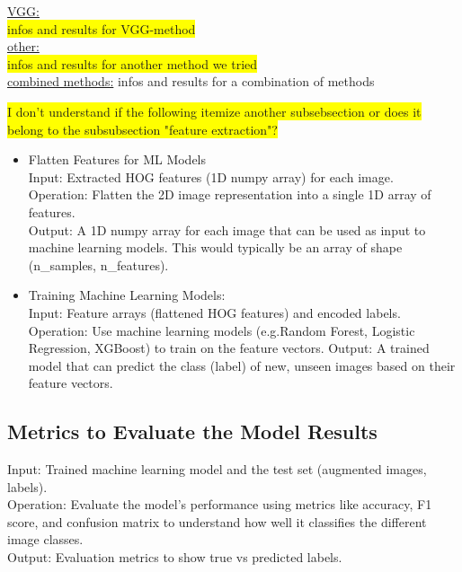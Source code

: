\documentclass{article}
\begin{document}
\vspace{0.5cm}
    

\underline{VGG:}\\
\colorbox{yellow}{infos and results for VGG-method}
\\

\underline{other:}\\
\colorbox{yellow}{infos and results for another method we tried}
\\

\underline{combined methods:}
infos and results for a combination of methods

\colorbox{yellow}{I don't understand if the following itemize another subsebsection or does it belong to the subsubsection "feature extraction"?}
\begin{itemize}
    \item Flatten Features for ML Models\\
    Input: Extracted HOG features (1D numpy array) for each image.\\
    Operation: Flatten the 2D image representation into a single 1D array of features.\\
    Output: A 1D numpy array for each image that can be used as input to machine learning models. This would typically be an array of shape (n\_samples, n\_features).\\
    \item Training Machine Learning Models:\\
    Input: Feature arrays (flattened HOG features) and encoded labels.
    Operation: Use machine learning models (e.g.Random Forest, Logistic Regression, XGBoost) to train on the feature vectors.
    Output: A trained model that can predict the class (label) of new, unseen images based on their feature vectors.
\end{itemize}


\subsection{Metrics to Evaluate the Model Results}
Input: Trained machine learning model and the test set (augmented images, labels).\\
Operation: Evaluate the model's performance using metrics like accuracy, F1 score, and confusion matrix to understand how well it classifies the different 
image classes.\\
Output: Evaluation metrics to show true vs predicted labels.
\end{document}
